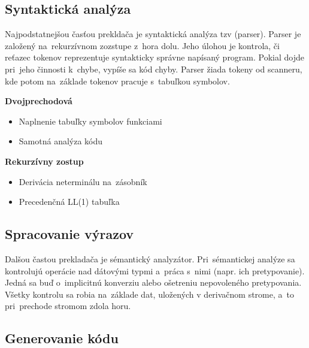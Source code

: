 \documentclass[a4paper, 11pt]{article}
\begin{document}
        
    \pagebreak    
        
    \subsection{Syntaktická analýza}
    
    Najpodstatnejšou časťou prekldača je syntaktická analýza tzv (parser). Parser je založený na~rekurzívnom zozstupe z~hora dolu. Jeho úlohou je kontrola, či reťazec tokenov reprezentuje syntakticky správne napísaný program. Pokial dojde pri~jeho činnosti k~chybe, vypíše sa kód chyby. Parser žiada tokeny od scanneru, kde potom na~základe tokenov pracuje s~tabuľkou symbolov.

    \vspace{4mm}
    
    \textbf{\large{Dvojprechodová}}
    \begin{itemize} 
        \item Naplnenie tabuľky symbolov funkciami
        \item Samotná analýza kódu
    \end{itemize}    
        
    \textbf{\large{Rekurzívny zostup}}
    \begin{itemize}
        \item Derivácia neterminálu na~zásobník
        \item Precedenčná LL(1) tabuľka
    \end{itemize}
    
        
    \subsection{Spracovanie výrazov}
    
    Dalšou častou prekladača je sémantický analyzátor. Pri~sémantickej analýze sa kontrolujú operácie nad dátovými typmi a~práca s~nimi (napr. ich pretypovanie). Jedná sa buď o~implicitnú konverziu alebo ošetreniu nepovoleného pretypovania. Všetky kontrolu sa robia na~základe dat, uložených v derivačnom strome, a~to pri~prechode stromom zdola horu.
        
    \subsection{Generovanie kódu}
    
\end{document}
